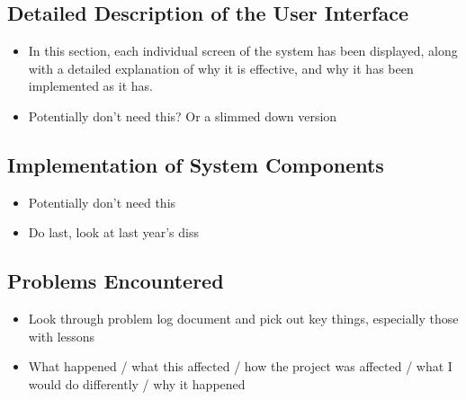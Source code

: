 \subsection{Detailed Description of the User Interface}
{\color{red}
	\begin{itemize}
		\item In this section, each individual screen of the system has been displayed, along with a detailed explanation of why it is effective, and why it has been implemented as it has.
		\item Potentially don't need this? Or a slimmed down version
	\end{itemize}
}


\subsection{Implementation of System Components}
{\color{red}
	\begin{itemize}
		\item Potentially don't need this
		\item Do last, look at last year's diss
	\end{itemize}
}


\subsection{Problems Encountered}
{\color{red}
	\begin{itemize}
		\item Look through problem log document and pick out key things, especially those with lessons
		\item What happened / what this affected / how the project was affected / what I would do differently / why it happened
	\end{itemize}
}